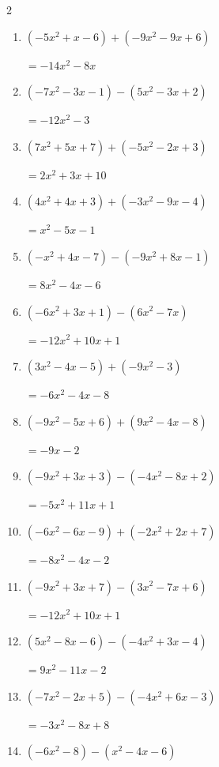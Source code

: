 \begin{multicols}{2}
\begin{enumerate}
        $=2x^{2}-17x-4$

  \item $(-5x^{2}+x-6)+(-9x^{2}-9x+6)$

        $=-14x^{2}-8x$

  \item $(-7x^{2}-3x-1)-(5x^{2}-3x+2)$

        $=-12x^{2}-3$

  \item $(7x^{2}+5x+7)+(-5x^{2}-2x+3)$

        $=2x^{2}+3x+10$

  \item $(4x^{2}+4x+3)+(-3x^{2}-9x-4)$

        $=x^{2}-5x-1$

  \item $(-x^{2}+4x-7)-(-9x^{2}+8x-1)$

        $=8x^{2}-4x-6$

\columnbreak %

  \item $(-6x^{2}+3x+1)-(6x^{2}-7x)$

        $=-12x^{2}+10x+1$

  \item $(3x^{2}-4x-5)+(-9x^{2}-3)$

        $=-6x^{2}-4x-8$

  \item $(-9x^{2}-5x+6)+(9x^{2}-4x-8)$

        $=-9x-2$

  \item $(-9x^{2}+3x+3)-(-4x^{2}-8x+2)$

        $=-5x^{2}+11x+1$

  \item $(-6x^{2}-6x-9)+(-2x^{2}+2x+7)$

        $=-8x^{2}-4x-2$

  \item $(-9x^{2}+3x+7)-(3x^{2}-7x+6)$

        $=-12x^{2}+10x+1$

  \item $(5x^{2}-8x-6)-(-4x^{2}+3x-4)$

        $=9x^{2}-11x-2$

  \item $(-7x^{2}-2x+5)-(-4x^{2}+6x-3)$

        $=-3x^{2}-8x+8$

  \item $(-6x^{2}-8)-(x^{2}-4x-6)$


\end{enumerate}
\end{multicols}

